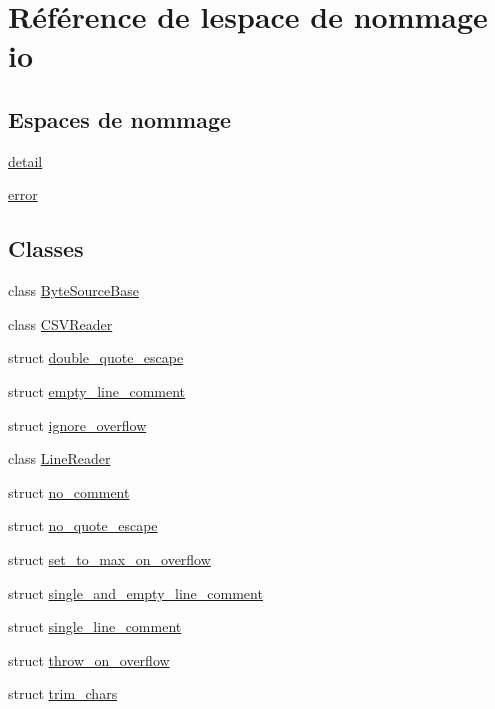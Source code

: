 \hypertarget{namespaceio}{}\section{Référence de l\textquotesingle{}espace de nommage io}
\label{namespaceio}
\subsection*{Espaces de nommage}
\begin{DoxyCompactItemize}
\item 
 \hyperlink{namespaceio_1_1detail}{detail}
\item 
 \hyperlink{namespaceio_1_1error}{error}
\end{DoxyCompactItemize}
\subsection*{Classes}
\begin{DoxyCompactItemize}
\item 
class \hyperlink{classio_1_1ByteSourceBase}{Byte\+Source\+Base}
\item 
class \hyperlink{classio_1_1CSVReader}{C\+S\+V\+Reader}
\item 
struct \hyperlink{structio_1_1double__quote__escape}{double\+\_\+quote\+\_\+escape}
\item 
struct \hyperlink{structio_1_1empty__line__comment}{empty\+\_\+line\+\_\+comment}
\item 
struct \hyperlink{structio_1_1ignore__overflow}{ignore\+\_\+overflow}
\item 
class \hyperlink{classio_1_1LineReader}{Line\+Reader}
\item 
struct \hyperlink{structio_1_1no__comment}{no\+\_\+comment}
\item 
struct \hyperlink{structio_1_1no__quote__escape}{no\+\_\+quote\+\_\+escape}
\item 
struct \hyperlink{structio_1_1set__to__max__on__overflow}{set\+\_\+to\+\_\+max\+\_\+on\+\_\+overflow}
\item 
struct \hyperlink{structio_1_1single__and__empty__line__comment}{single\+\_\+and\+\_\+empty\+\_\+line\+\_\+comment}
\item 
struct \hyperlink{structio_1_1single__line__comment}{single\+\_\+line\+\_\+comment}
\item 
struct \hyperlink{structio_1_1throw__on__overflow}{throw\+\_\+on\+\_\+overflow}
\item 
struct \hyperlink{structio_1_1trim__chars}{trim\+\_\+chars}
\end{DoxyCompactItemize}
